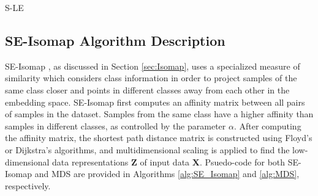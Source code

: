 \begin{algorithm}[h!]
	\caption{S-LE}
	\label{alg:SLE}
	\begin{algorithmic}[1]
		\Else
		\EndIf
		\EndFor
	\end{algorithmic}
\end{algorithm}

\subsection{SE-Isomap Algorithm Description}
SE-Isomap \citep{Ribeiro2008SupervisedIsomap}, as discussed in Section \ref{sec:Isomap}, uses a specialized measure of similarity which considers class information in order to project samples of the same class closer and points in different classes away from each other in the embedding space. SE-Isomap first computes an affinity matrix between all pairs of samples in the dataset.  Samples from the same class have a higher affinity than samples in different classes, as controlled by the parameter $\alpha$.  After computing the affinity matrix, the shortest path distance matrix is constructed using Floyd's or Dijkstra's algorithms, and multidimensional  scaling is applied to find the low-dimensional data representations $\bm{Z}$ of input data $\bm{X}$. Psuedo-code for both SE-Isomap and MDS are provided in Algorithms \ref{alg:SE_Isomap} and \ref{alg:MDS}, respectively.

